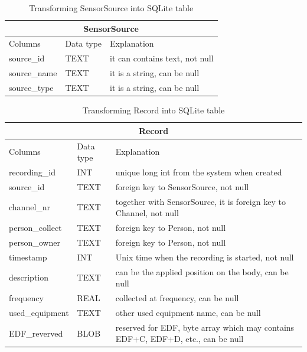 \begin{table}
\begin{center}
\begin{tabular}{ |p{4cm}|p{1.8cm}|p{6.2cm}|  }
 \hline
 \multicolumn{3}{|c|}{SensorSource} \\
 \hline
 Columns& Data type & Explanation \\
 \hline
 source\_id& TEXT& it can contains text, not null\\
 source\_name& TEXT& it is a string, can be null\\
 source\_type& TEXT& it is a string, can be null\\
 \hline
\end{tabular}
\end{center}
\caption{Transforming SensorSource into SQLite table}
\label{tab:SensorSourceTypeSQL}
\end{table}
\begin{table}
\begin{center}
\begin{tabular}{ |p{4cm}|p{1.8cm}|p{6.2cm}|  }
 \hline
 \multicolumn{3}{|c|}{Record} \\
 \hline
 Columns& Data type & Explanation \\
 \hline
 recording\_id& INT& unique long int from the system when created\\
 source\_id& TEXT& foreign key to SensorSource, not null\\
 channel\_nr& TEXT& together with SensorSource, it is foreign key to Channel, not null\\
 person\_collect& TEXT& foreign key to Person, not null\\
 person\_owner& TEXT& foreign key to Person, not null\\
 timestamp& INT& Unix time when the recording is started, not null\\
 description& TEXT& can be the applied position on the body, can be null\\
 frequency& REAL& collected at frequency, can be null\\
 used\_equipment& TEXT& other used equipment name, can be null\\
 EDF\_reverved& BLOB& reserved for EDF, byte array which may contains EDF+C, EDF+D, etc., can be null\\
 \hline
\end{tabular}
\end{center}
\caption{Transforming Record into SQLite table}
\label{tab:RecordTypeSQL}
\end{table}
